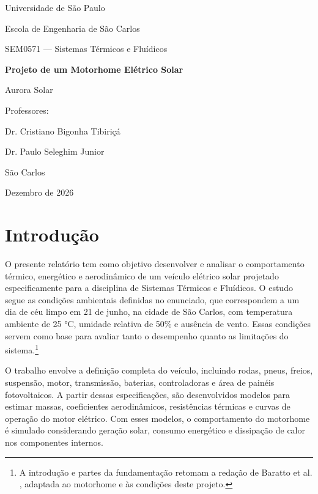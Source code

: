 \documentclass[12pt,a4paper]{article}
\begin{document}
\hypersetup{pageanchor=false}
\begin{titlepage}
\centering
{\large Universidade de São Paulo\par Escola de Engenharia de São Carlos\par}
\vspace{1.8cm}
{\Large SEM0571 — Sistemas Térmicos e Fluídicos\par}
\vspace{0.4cm}
{\LARGE\bfseries Projeto de um Motorhome Elétrico Solar\par}
\vspace{0.3cm}
{\Large Aurora Solar\par}
\vspace{1.5cm}
\par
\vspace{1cm}
{Professores:\par Dr. Cristiano Bigonha Tibiriçá\par Dr. Paulo Seleghim Junior\par}
\vfill
{São Carlos\par Dezembro de 2026\par}
\end{titlepage}
\hypersetup{pageanchor=true}

{\small\tableofcontents}
\clearpage

\section{Introdução}
O presente relatório tem como objetivo desenvolver e analisar o comportamento térmico,
energético e aerodinâmico de um veículo elétrico solar projetado especificamente para a
disciplina de Sistemas Térmicos e Fluídicos. O estudo segue as condições ambientais
definidas no enunciado, que correspondem a um dia de céu limpo em 21 de junho, na cidade
de São Carlos, com temperatura ambiente de 25 °C, umidade relativa de 50\% e ausência de
vento. Essas condições servem como base para avaliar tanto o desempenho quanto as
limitações do sistema.\footnote{A introdução e partes da fundamentação retomam a redação de Baratto et al.
\cite{cuca}, adaptada ao motorhome e às condições deste projeto.}

O trabalho envolve a definição completa do veículo, incluindo rodas, pneus, freios,
suspensão, motor, transmissão, baterias, controladoras e área de painéis fotovoltaicos.
A partir dessas especificações, são desenvolvidos modelos para estimar massas,
coeficientes aerodinâmicos, resistências térmicas e curvas de operação do motor elétrico.
Com esses modelos, o comportamento do motorhome é simulado considerando geração solar,
consumo energético e dissipação de calor nos componentes internos.
\end{document}
